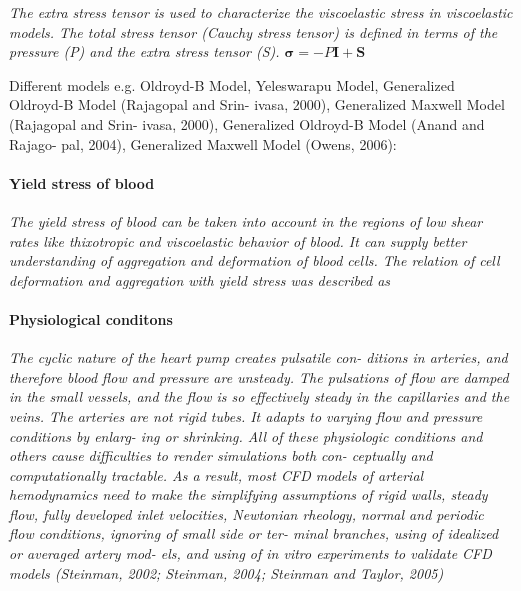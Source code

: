\documentclass[11pt,letterpaper]{article}
\begin{document}
 \textit{The extra stress tensor is used to characterize the viscoelastic stress in viscoelastic models. The total stress tensor (Cauchy stress tensor) is defined in terms of the pressure (P) and the  extra stress tensor (S). $\bm{\sigma}= -P\bm{I+ \bm{S}}$}

Different models e.g. Oldroyd-B Model, Yeleswarapu Model, Generalized Oldroyd-B Model (Rajagopal and Srin- ivasa, 2000), Generalized Maxwell Model (Rajagopal and Srin- ivasa, 2000), Generalized Oldroyd-B Model (Anand and Rajago- pal, 2004), Generalized Maxwell Model (Owens,  2006):


\paragraph{Yield stress of blood}
\textit{The yield  stress of blood can  be taken  into  account in  the
regions of low shear rates like thixotropic and viscoelastic behavior of blood.  It can supply better  understanding  of aggregation  and  deformation of blood cells. The  relation of cell deformation and aggregation with yield stress was described as}

\paragraph{Physiological conditons}
\textit{The cyclic nature  of the  heart  pump creates  pulsatile con-
ditions in arteries, and therefore blood flow and  pressure are unsteady. The pulsations of  flow  are damped in the small vessels, and the  flow is so effectively  steady in  the capillaries and the veins.  The arteries are not rigid tubes. It adapts to varying flow and pressure  conditions  by  enlarg- ing or shrinking. All of these  physiologic conditions and others cause difficulties to  render simulations  both con- ceptually and computationally tractable. As a result, most CFD  models of arterial  hemodynamics need  to make  the simplifying assumptions of  rigid walls, steady flow, fully developed  inlet velocities, Newtonian rheology,  normal and  periodic flow conditions, ignoring of small side or ter- minal  branches, using  of  idealized or averaged artery  mod- els, and using of in vitro  experiments to validate CFD models (Steinman, 2002; Steinman,  2004; Steinman and Taylor, 2005)}
\end{document}
